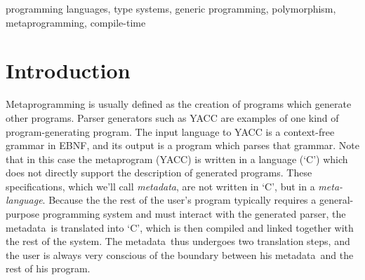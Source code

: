 \documentclass{kapproc}
\newcommand{\Cpp}{C\kern-0.05em\texttt{+\kern-0.03em+}%
}
\newcommand{\Mpl}{Boost Meta\-pro\-gram\-ming Library}
\newcommand{\mping}{meta\-pro\-gram\-ming}
\newcommand{\mpgm}{meta\-pro\-gram}
\newcommand{\mdat}{meta\-data}
\begin{document}
\articletitle{The Boost \Cpp\ Metaprogramming Library}

\author{Aleksey Gurtovoy} 
\author{David Abrahams}


\begin{abstract} $\!$This paper describes the Boost \Cpp Template
Meta\-program\-ming Library (MPL), an extensible compile-time
framework of algorithms, sequences and function classes. The library
brings together important abstractions from the generic and functional
programming worlds to build a powerful and easy-to-use toolset which
makes template \mping{} practical enough for the real-world
environments. The MPL is heavily influenced by its run-time equivalent
- the Standard Template Library (STL), a part of the C++ standard
library. Like the STL, it defines an open conceptual and
implementation framework which can serve as a foundation for future
contributions in the domain. The library's fundamental concepts and
idioms enable the user to focus on solutions without navigating the
universe of possible ad-hoc approaches to a given \mping{} problem,
even if no actual MPL code is used.  The \Mpl also provides a
compile-time lambda expression facility enabling arbitrary currying
and composition of class templates, a feature whose runtime
counterpart is often cited as missing from the STL. This paper
explains the motivation, usage, design, and implementation of the MPL
with examples of its real-life applications, and offers some lessons
learned about C++ template \mping{}.
\end{abstract}

\begin{keywords}
programming languages, type systems, generic programming,
polymorphism, metaprogramming, compile-time
\end{keywords}

\section{Introduction}

Metaprogramming is usually defined as the creation of programs which
generate other programs. Parser generators such as YACC are examples
of one kind of program-generating program. The input language to YACC
is a context-free grammar in EBNF, and its output is a program which
parses that grammar. Note that in this case the \mpgm{} (YACC) is
written in a language (`C') which does not directly support the
description of generated programs. These specifications, which we'll
call \emph{\mdat}, are not written in `C', but in a
\emph{meta-language}. Because the the rest of the user's program
typically requires a general-purpose programming system and must
interact with the generated parser, the \mdat\ is translated into
`C', which is then compiled and linked together with the rest of the
system. The \mdat\ thus undergoes two translation steps, and the
user is always very conscious of the boundary between his \mdat\
and the rest of his program.
\end{document}
